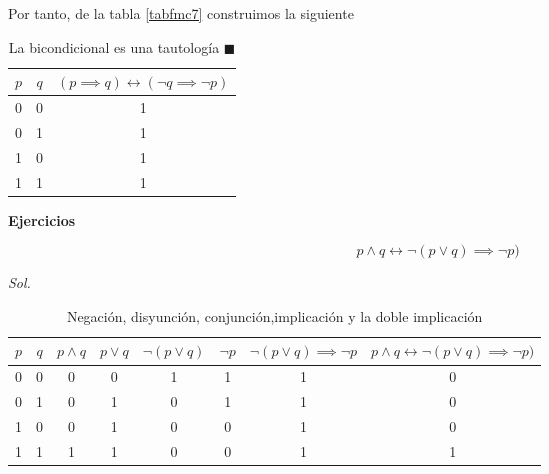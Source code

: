 Por tanto, de la tabla \ref{tabfmc7} construimos la siguiente

\begin{table}[h!]
	\centering
	\begin{tabular}{|c|c|c|}
		\hline
		$p$ & $q$ & $(p \implies q) \longleftrightarrow (\lnot q\implies \lnot p)$ \\ \hline
		0   & 0   & 1                                                              \\ \hline
		0   & 1   & 1                                                              \\ \hline
		1   & 0   & 1                                                              \\ \hline
		1   & 1   & 1                                                              \\ \hline
	\end{tabular}
	\caption{La bicondicional es una tautología $\blacksquare$}
	\label{tabfmc8}
\end{table}


\textbf{Ejercicios}
\begin{problem}
\begin{equation*}
	p \land q \longleftrightarrow  \lnot (p\lor q) \implies \lnot p)
\end{equation*}
\end{problem}
\textit{ Sol. }

\begin{table}[h!]
	\centering
	\begin{tabular}{|c|c|c|c|c|c|c|c|}
		\hline
		$p$ & $q$ & $p \land q$ & $p\lor q$ & $\lnot (p\lor q)$ & $\lnot p$ & $\lnot (p\lor q) \implies \lnot p$ & $p \land q \longleftrightarrow  \lnot (p\lor q) \implies \lnot p)$ \\ \hline
		0   & 0   & 0           & 0         & 1                 & 1         & 1                                  & 0                                                                  \\ \hline
		0   & 1   & 0           & 1         & 0                 & 1         & 1                                  & 0                                                                  \\ \hline
		1   & 0   & 0           & 1         & 0                 & 0         & 1                                  & 0                                                                  \\ \hline
		1   & 1   & 1           & 1         & 0                 & 0         & 1                                  & 1                                                                  \\ \hline
	\end{tabular}
	\caption{Negación, disyunción, conjunción,implicación y la doble implicación}
	\label{tabfmc9}
\end{table}


